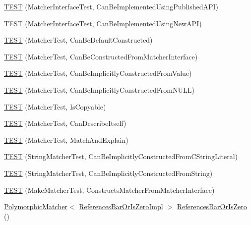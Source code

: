 \begin{DoxyCompactItemize}
\hyperlink{namespacetesting_1_1gmock__matchers__test_a2d73acaddb6b28a827ce0e475ffc9cde}{T\+E\+ST} (Matcher\+Interface\+Test, Can\+Be\+Implemented\+Using\+Published\+A\+PI)
\item 
\hyperlink{namespacetesting_1_1gmock__matchers__test_ad212c5ac3ef7a102a6b1712e40e06a1e}{T\+E\+ST} (Matcher\+Interface\+Test, Can\+Be\+Implemented\+Using\+New\+A\+PI)
\item 
\hyperlink{namespacetesting_1_1gmock__matchers__test_a8843a1545b9e09d73b565cf94f2e5f8b}{T\+E\+ST} (Matcher\+Test, Can\+Be\+Default\+Constructed)
\item 
\hyperlink{namespacetesting_1_1gmock__matchers__test_a3dee288df7e811f817850a5187c42669}{T\+E\+ST} (Matcher\+Test, Can\+Be\+Constructed\+From\+Matcher\+Interface)
\item 
\hyperlink{namespacetesting_1_1gmock__matchers__test_a2bd9ad37a8b9f03b10a15ed322c3249c}{T\+E\+ST} (Matcher\+Test, Can\+Be\+Implicitly\+Constructed\+From\+Value)
\item 
\hyperlink{namespacetesting_1_1gmock__matchers__test_a0de94b029c8a13180276e411f4d75f7f}{T\+E\+ST} (Matcher\+Test, Can\+Be\+Implicitly\+Constructed\+From\+N\+U\+LL)
\item 
\hyperlink{namespacetesting_1_1gmock__matchers__test_ab37bd0e535503a8f39e34b0554b2fb28}{T\+E\+ST} (Matcher\+Test, Is\+Copyable)
\item 
\hyperlink{namespacetesting_1_1gmock__matchers__test_ae85f2ec21822e884ac9ff58741d420d2}{T\+E\+ST} (Matcher\+Test, Can\+Describe\+Itself)
\item 
\hyperlink{namespacetesting_1_1gmock__matchers__test_aee6cef32b22ddd6ce8b87578c3de4198}{T\+E\+ST} (Matcher\+Test, Match\+And\+Explain)
\item 
\hyperlink{namespacetesting_1_1gmock__matchers__test_a17fb479932a88dc4e334327c5e12c8d6}{T\+E\+ST} (String\+Matcher\+Test, Can\+Be\+Implicitly\+Constructed\+From\+C\+String\+Literal)
\item 
\hyperlink{namespacetesting_1_1gmock__matchers__test_a6786eca17f1fc4d6250470cc21ec79f1}{T\+E\+ST} (String\+Matcher\+Test, Can\+Be\+Implicitly\+Constructed\+From\+String)
\item 
\hyperlink{namespacetesting_1_1gmock__matchers__test_ae433e93168010d7316b40ef4a5088d09}{T\+E\+ST} (Make\+Matcher\+Test, Constructs\+Matcher\+From\+Matcher\+Interface)
\item 
\hyperlink{classtesting_1_1_polymorphic_matcher}{Polymorphic\+Matcher}$<$ \hyperlink{classtesting_1_1gmock__matchers__test_1_1_references_bar_or_is_zero_impl}{References\+Bar\+Or\+Is\+Zero\+Impl} $>$ \hyperlink{namespacetesting_1_1gmock__matchers__test_ac07376a5dff45a905b7eb96e621ce3aa}{References\+Bar\+Or\+Is\+Zero} ()

\end{DoxyCompactItemize}
